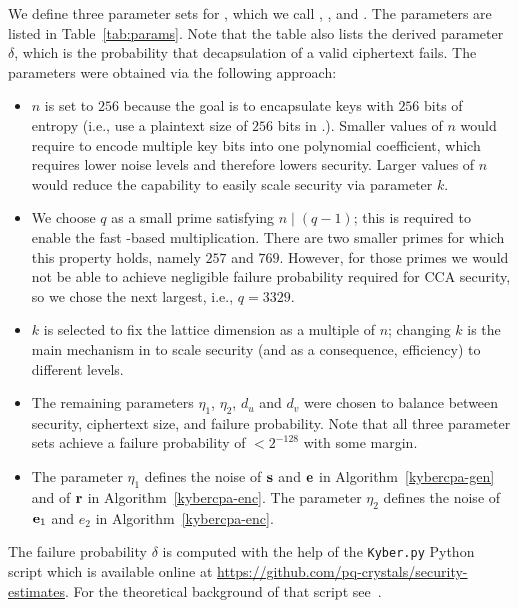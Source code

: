 We define three parameter sets for \Kyber, which we call \KyberLow, \KyberMid, and \KyberHigh.
The parameters are listed in Table~\ref{tab:params}. Note that the table also lists the
derived parameter $\delta$, which is the probability that decapsulation of a valid
\KyberCCAKEM ciphertext fails. The parameters were obtained via the following approach:
\begin{itemize}
  \item $n$ is set to $256$ because the goal is to encapsulate keys with $256$ bits of entropy 
    (i.e., use a plaintext size of $256$ bits in \KyberCPAPKE.\PKEEnc).
    Smaller values of $n$ would require to encode multiple key bits into one polynomial
    coefficient, which requires lower noise levels and therefore lowers security.
    Larger values of $n$ would reduce the capability to easily scale security via
    parameter $k$.
  \item We choose $q$ as a small prime satisfying $n \mid (q-1)$; 
    this is required to enable the fast \NTT-based multiplication.
    There are two smaller primes for which this property holds, namely
    $257$ and $769$. However, for those primes we would not be able
    to achieve negligible failure probability required for CCA security, 
    so we chose the next largest, i.e., $q=3329$.
  \item $k$ is selected to fix the lattice dimension as a multiple of $n$;
    changing $k$ is the main mechanism in \Kyber to scale security (and as a consequence,
    efficiency) to different levels.
  \item The remaining parameters $\eta_1$, $\eta_2$, $d_u$ and $d_v$ were chosen to balance
    between security, ciphertext size,
    and failure probability. Note that all three parameter sets achieve a failure probability of $<2^{-128}$
    with some margin.
  \item The parameter $\eta_1$ defines the noise of $\mathbf{s}$ and $\mathbf{e}$ in Algorithm~\ref{kybercpa-gen} and of $\mathbf{r}$ in Algorithm~\ref{kybercpa-enc}.  The parameter $\eta_2$ defines the noise of $\mathbf{e}_1$ and $e_2$ in Algorithm~\ref{kybercpa-enc}. 
\end{itemize}

The failure probability $\delta$ is computed with the help of the \verb_Kyber.py_ 
Python script which is available online at 
\url{https://github.com/pq-crystals/security-estimates}.
For the theoretical background of that script see~\cite[Theorem~1]{BDK+18}.

